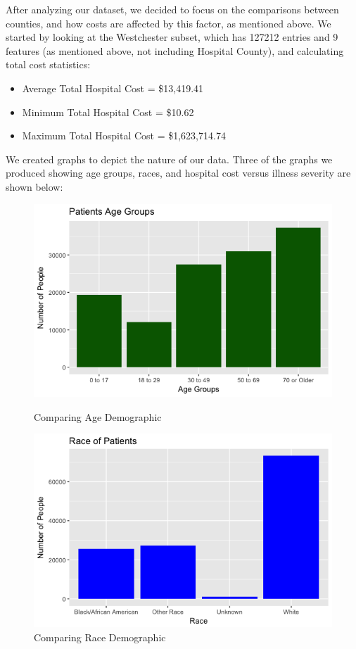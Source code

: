 \documentclass{article}
\begin{document}
After analyzing our dataset, we decided to focus on the comparisons between counties, and how costs are affected by this factor, as mentioned above. We started by looking at the Westchester subset, which has 127212 entries and 9 features (as mentioned above, not including Hospital County), and calculating total cost statistics:
\begin{itemize}
\setlength{\itemsep}{1pt}
  \item Average Total Hospital Cost = \$13,419.41 
  \item Minimum Total Hospital Cost = \$10.62 
  \item Maximum Total Hospital Cost = \$1,623,714.74 
\end{itemize}
We created graphs to depict the nature of our data. Three of the graphs we produced showing age groups, races, and hospital cost versus illness severity are shown below:

\begin{figure}[h]
  \centering
  \begin{minipage}[b]{0.4\textwidth}
    \includegraphics[width=\textwidth]{patientsAge.png}
    \caption{Comparing Age Demographic}
  \end{minipage}
  \hfill
  \begin{minipage}[b]{0.4\textwidth}
    \includegraphics[width=\textwidth]{race.png}
    \caption{Comparing Race Demographic}
  \end{minipage}
\end{figure}
\end{document}
